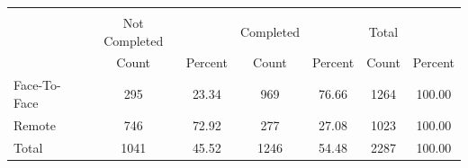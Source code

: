 {
\def\sym#1{\ifmmode^{#1}\else\(^{#1}\)\fi}
\begin{tabular}{l*{3}{cc}}
\hline\hline
            &\multicolumn{6}{c}{}                                                                           \\
            &  Not Completed&               &      Completed&               &          Total&               \\
            &          Count&        Percent&          Count&        Percent&          Count&        Percent\\
\hline
Face-To-Face&            295&          23.34&            969&          76.66&           1264&         100.00\\
Remote      &            746&          72.92&            277&          27.08&           1023&         100.00\\
Total       &           1041&          45.52&           1246&          54.48&           2287&         100.00\\
\hline\hline
\end{tabular}
}
